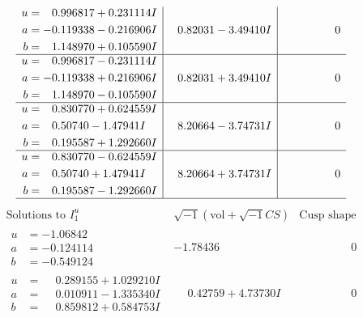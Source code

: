 \documentclass[1p]{elsarticle_modified}
\theoremstyle{definition}
\newcommand{\I}{\sqrt{-1}}
\begin{document}
$$\begin{array}{c|c|c}
\begin{aligned}
u &= \phantom{-}0.996817 + 0.231114 I \\
a &= -0.119338 - 0.216906 I \\
b &= \phantom{-}1.148970 + 0.105590 I\end{aligned}
 & \phantom{-}0.82031 - 3.49410 I & \phantom{-0.000000 } 0 \\ \hline\begin{aligned}
u &= \phantom{-}0.996817 - 0.231114 I \\
a &= -0.119338 + 0.216906 I \\
b &= \phantom{-}1.148970 - 0.105590 I\end{aligned}
 & \phantom{-}0.82031 + 3.49410 I & \phantom{-0.000000 } 0 \\ \hline\begin{aligned}
u &= \phantom{-}0.830770 + 0.624559 I \\
a &= \phantom{-}0.50740 - 1.47941 I \\
b &= \phantom{-}0.195587 + 1.292660 I\end{aligned}
 & \phantom{-}8.20664 - 3.74731 I & \phantom{-0.000000 } 0 \\ \hline\begin{aligned}
u &= \phantom{-}0.830770 - 0.624559 I \\
a &= \phantom{-}0.50740 + 1.47941 I \\
b &= \phantom{-}0.195587 - 1.292660 I\end{aligned}
 & \phantom{-}8.20664 + 3.74731 I & \phantom{-0.000000 } 0\\
 \hline 
 \end{array}$$\newpage$$\begin{array}{c|c|c}  
\text{Solutions to }I^u_{1}& \I (\text{vol} + \sqrt{-1}CS) & \text{Cusp shape}\\
 \hline 
\begin{aligned}
u &= -1.06842\phantom{ +0.000000I} \\
a &= -0.124114\phantom{ +0.000000I} \\
b &= -0.549124\phantom{ +0.000000I}\end{aligned}
 & -1.78436\phantom{ +0.000000I} & \phantom{-0.000000 } 0 \\ \hline\begin{aligned}
u &= \phantom{-}0.289155 + 1.029210 I \\
a &= \phantom{-}0.010911 - 1.335340 I \\
b &= \phantom{-}0.859812 + 0.584753 I\end{aligned}
 & \phantom{-}0.42759 + 4.73730 I & \phantom{-0.000000 } 0 \\ \hline\begin{aligned}

\end{aligned}
\end{array}$$
\end{document}
